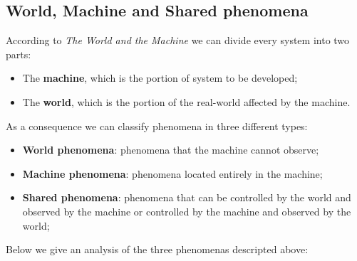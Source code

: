 \documentclass[a4paper, hidelinks, 12pt]{report}
\begin{document}
        \subsection{World, Machine and Shared phenomena}\label{subsec:world,-machine-and-shared-phenomena}
            According to \textit{The World and the Machine} we can divide every system into two parts:
            \begin{itemize}
                \item The \textbf{machine}, which is the portion of system to be developed;
                \item The \textbf{world}, which is the portion of the real-world affected by the machine.
            \end{itemize}
            As a consequence we can classify phenomena in three different types:
            \begin{itemize}
                \item \textbf{World phenomena}: phenomena that the machine cannot observe;
                \item \textbf{Machine phenomena}: phenomena located entirely in the machine;
                \item \textbf{Shared phenomena}: phenomena that can be controlled by the world and observed by the machine or controlled by the machine and observed by the world;
            \end{itemize}
            Below we give an analysis of the three phenomenas descripted above:
\end{document}

